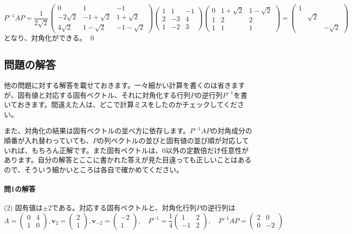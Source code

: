 \[
P^{-1} A P 
=
\frac{1}{2\sqrt{2}}
\begin{pmatrix}
0 & 1 & -1 \\
-2\sqrt{2} & -1 + \sqrt{2} & 1 + \sqrt{2} \\
4\sqrt{2} & 1 - \sqrt{2} & -1 - \sqrt{2}
\end{pmatrix}
\begin{pmatrix}
1 & 1 & -1 \\
2 & -3 & 4 \\
1 & -2 & 3
\end{pmatrix}
\begin{pmatrix}
0 & 1 + \sqrt{2} & 1 - \sqrt{2} \\
1 & 2 & 2 \\
1 & 1 & 1
\end{pmatrix}
=
\begin{pmatrix}
1 \\
& \sqrt{2} \\
& & -\sqrt{2}
\end{pmatrix}
\]
となり、対角化ができる。 \qed

\subsection{問題の解答}

他の問題に対する解答を載せておきます。一々細かい計算を書くのは省きますが、固有値と対応する固有ベクトル、それに対角化する行列$P$の逆行列$P^{-1}$を書いておきます。間違えた人は、どこで計算ミスをしたのかチェックしてください。

また、対角化の結果は固有ベクトルの並べ方に依存します。$P^{-1} A P$の対角成分の順番が入れ替わっていても、$P$の列ベクトルの並びと固有値の並び順が対応していれば、もちろん正解です。また固有ベクトルは、$0$以外の定数倍だけ任意性があります。自分の解答とここに書かれた答えが見た目違っても正しいことはあるので、そういう細かいところは各自で確かめてください。

\paragraph{問1の解答} (2) 固有値は$\pm2$である。対応する固有ベクトルと、対角化行列$P$の逆行列は
\[
A =
\begin{pmatrix}
0 & 4 \\
1 & 0
\end{pmatrix}, 
\bm{v}_2 = 
\begin{pmatrix}
2 \\
1
\end{pmatrix}, 
\bm{v}_{-2} = 
\begin{pmatrix}
-2 \\
1
\end{pmatrix}, \quad
P^{-1} = 
\frac{1}{4}
\begin{pmatrix}
1 & 2 \\
-1 & 2
\end{pmatrix}, \quad
P^{-1} AP =
\begin{pmatrix}
2 & 0 \\
0 & -2
\end{pmatrix}
\]

